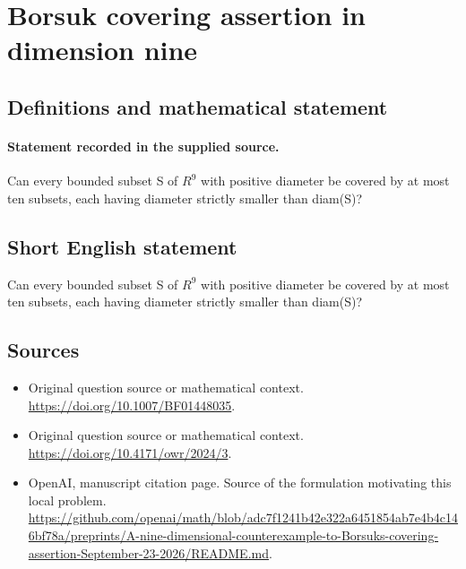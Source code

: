 \documentclass[11pt]{article}
\begin{document}
\section*{Borsuk covering assertion in dimension nine}\label{statement}
\subsection{Definitions and mathematical statement}
\paragraph{Statement recorded in the supplied source.}
Can every bounded subset S of $R^9$ with positive diameter be covered by at most ten subsets, each having diameter strictly smaller than diam(S)?
\subsection{Short English statement}
Can every bounded subset S of $R^9$ with positive diameter be covered by at most ten subsets, each having diameter strictly smaller than diam(S)?
\subsection{Sources}
\begin{itemize}
\item[S1] Original question source or mathematical context.
\url{https://doi.org/10.1007/BF01448035}.
\item[S2] Original question source or mathematical context.
\url{https://doi.org/10.4171/owr/2024/3}.
\item[S3] OpenAI, manuscript citation page. Source of the formulation motivating this local problem.
\url{https://github.com/openai/math/blob/adc7f1241b42e322a6451854ab7e4b4c146bf78a/preprints/A-nine-dimensional-counterexample-to-Borsuks-covering-assertion-September-23-2026/README.md}.
\end{itemize}
\end{document}
